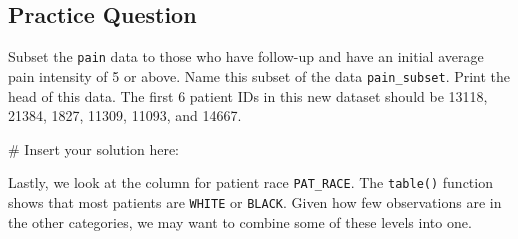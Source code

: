 \documentclass[
  letterpaper,
]{krantz}
\makeatletter
\newenvironment{Shaded}{\begin{snugshade}}{\end{snugshade}}
\newcommand{\CommentTok}[1]{\textcolor[rgb]{0.37,0.37,0.37}{#1}}
\newcommand{\FunctionTok}[1]{\textcolor[rgb]{0.28,0.35,0.67}{#1}}
\newcommand{\NormalTok}[1]{\textcolor[rgb]{0.00,0.23,0.31}{#1}}
\newcommand{\SpecialCharTok}[1]{\textcolor[rgb]{0.37,0.37,0.37}{#1}}
\newenvironment{kframe}{%
\medskip{}
\setlength{\fboxsep}{.8em}
 \def\at@end@of@kframe{}%
 \ifinner\ifhmode%
  \def\at@end@of@kframe{\end{minipage}}%
  \begin{minipage}{\columnwidth}%
 \fi\fi%
 \def\FrameCommand##1{\hskip\@totalleftmargin \hskip-\fboxsep
 \colorbox{shadecolor}{##1}\hskip-\fboxsep
     \hskip-\linewidth \hskip-\@totalleftmargin \hskip\columnwidth}%
 \MakeFramed {\advance\hsize-\width
   \@totalleftmargin\z@ \linewidth\hsize
   \@setminipage}}%
 {\par\unskip\endMakeFramed%
 \at@end@of@kframe}
\renewenvironment{Shaded}{\begin{kframe}}{\end{kframe}}
\makeatother
\begin{document}
\hypertarget{practice-question-5}{%
\subsection{Practice Question}\label{practice-question-5}}

Subset the \texttt{pain} data to those who have follow-up and have an
initial average pain intensity of 5 or above. Name this subset of the
data \texttt{pain\_subset}. Print the head of this data. The first 6
patient IDs in this new dataset should be 13118, 21384, 1827, 11309,
11093, and 14667.

\begin{Shaded}
\begin{Highlighting}[]
\CommentTok{\# Insert your solution here:}
\end{Highlighting}
\end{Shaded}

Lastly, we look at the column for patient race \texttt{PAT\_RACE}. The
\texttt{table()} function shows that most patients are \texttt{WHITE} or
\texttt{BLACK}. Given how few observations are in the other categories,
we may want to combine some of these levels into one.

\begin{Shaded}
\end{Shaded}
\end{document}
